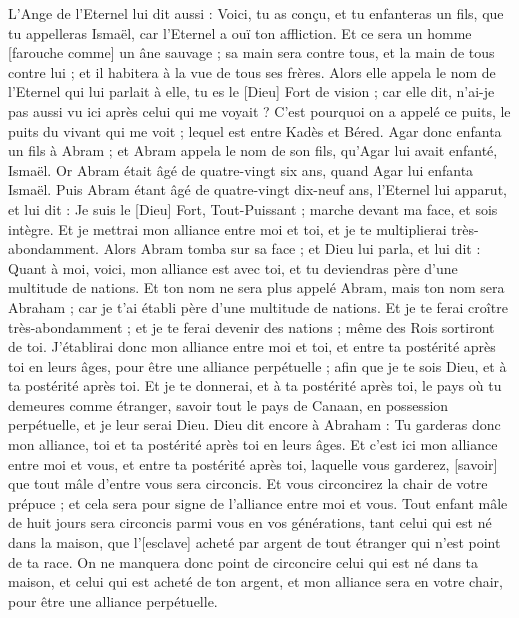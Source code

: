 \begin{multicols}{2}
L'Ange de l'Eternel lui dit aussi : Voici, tu as conçu, et tu enfanteras un fils, que tu appelleras Ismaël, car l'Eternel a ouï ton affliction.
Et ce sera un homme [farouche comme] un âne sauvage ; sa main sera contre tous, et la main de tous contre lui ; et il habitera à la vue de tous ses frères.
Alors elle appela le nom de l'Eternel qui lui parlait à elle, tu es le [Dieu] Fort de vision ; car elle dit, n'ai-je pas aussi vu ici après celui qui me voyait ?
C'est pourquoi on a appelé ce puits, le puits du vivant qui me voit ; lequel est entre Kadès et Béred.
Agar donc enfanta un fils à Abram ; et Abram appela le nom de son fils, qu'Agar lui avait enfanté, Ismaël.
Or Abram était âgé de quatre-vingt six ans, quand Agar lui enfanta Ismaël.
\VerseOne{}Puis Abram étant âgé de quatre-vingt dix-neuf ans, l'Eternel lui apparut, et lui dit : Je suis le [Dieu] Fort, Tout-Puissant ; marche devant ma face, et sois intègre.
Et je mettrai mon alliance entre moi et toi, et je te multiplierai très-abondamment.
Alors Abram tomba sur sa face ; et Dieu lui parla, et lui dit :
Quant à moi, voici, mon alliance est avec toi, et tu deviendras père d'une multitude de nations.
Et ton nom ne sera plus appelé Abram, mais ton nom sera Abraham ; car je t'ai établi père d'une multitude de nations.
Et je te ferai croître très-abondamment ; et je te ferai devenir des nations ; même des Rois sortiront de toi.
J'établirai donc mon alliance entre moi et toi, et entre ta postérité après toi en leurs âges, pour être une alliance perpétuelle ; afin que je te sois Dieu, et à ta postérité après toi.
Et je te donnerai, et à ta postérité après toi, le pays où tu demeures comme étranger, savoir tout le pays de Canaan, en possession perpétuelle, et je leur serai Dieu.
Dieu dit encore à Abraham : Tu garderas donc mon alliance, toi et ta postérité après toi en leurs âges.
Et c'est ici mon alliance entre moi et vous, et entre ta postérité après toi, laquelle vous garderez, [savoir] que tout mâle d'entre vous sera circoncis.
Et vous circoncirez la chair de votre prépuce ; et cela sera pour signe de l'alliance entre moi et vous.
Tout enfant mâle de huit jours sera circoncis parmi vous en vos générations, tant celui qui est né dans la maison, que l'[esclave] acheté par argent de tout étranger qui n'est point de ta race.
On ne manquera donc point de circoncire celui qui est né dans ta maison, et celui qui est acheté de ton argent, et mon alliance sera en votre chair, pour être une alliance perpétuelle.

\end{multicols}
